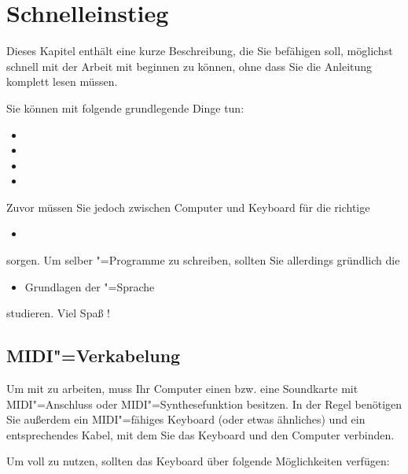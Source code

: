 \chapter{Schnelleinstieg}\label{sec:CC_BASICS}

Dieses Kapitel enthält eine kurze Beschreibung, die Sie befähigen
soll, möglichst schnell mit der Arbeit mit \mutabor{} beginnen zu
können, ohne dass Sie die Anleitung komplett lesen müssen.

Sie können mit \mutabor{} folgende grundlegende Dinge tun:

\begin{itemize}
\item {}
\item {}
\item {}
\item {}
\end{itemize}

Zuvor müssen Sie jedoch zwischen Computer und Keyboard für 
die richtige

\begin{itemize}
\item {}
\end{itemize}

sorgen. Um selber \mutabor{}"=Programme zu schreiben, sollten 
Sie allerdings gründlich die


\begin{itemize}
\item Grundlagen der \mutabor{}"=Sprache
\end{itemize}

studieren. Viel Spaß !


\section{MIDI"=Verkabelung}\label{sec:CC_CABLE}

Um mit \mutabor{} zu arbeiten, muss Ihr Computer einen  
bzw. eine Soundkarte mit MIDI"=Anschluss oder MIDI"=Synthesefunktion 
besitzen. In der Regel benötigen Sie außerdem ein MIDI"=fähiges 
Keyboard (oder etwas ähnliches) und ein entsprechendes Kabel, 
mit dem Sie das Keyboard und den Computer verbinden.

Um \mutabor{} voll zu nutzen, sollten das Keyboard über folgende 
Möglichkeiten verfügen:

